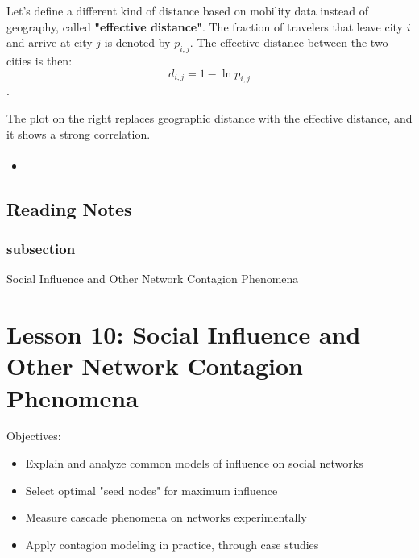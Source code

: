 \documentclass[11pt]{scrartcl} %
\begin{document}
Let's define a different kind of distance based on mobility data instead of geography, called \textbf{"effective distance"}. The fraction of travelers that leave city $i$ and arrive at city $j$ is denoted by $p_{i,j}$. The effective distance between the two cities is then: 
\[d_{i,j} = 1 - \ln p_{i,j} \].

The plot on the right replaces geographic distance with the effective distance, and it shows a strong correlation.



\paragraph{}

\textbf{}

\begin{itemize}
	\item 
\end{itemize}

\subsection{Reading Notes}

\subsubsection{subsection}
\textbf{}


 Social Influence and Other Network Contagion Phenomena
\section{Lesson 10: Social Influence and Other Network Contagion Phenomena}

Objectives:
\begin{itemize}
	\item Explain and analyze common models of influence on social networks 
	\item Select optimal "seed nodes" for maximum influence
	\item Measure cascade phenomena on networks experimentally
	\item Apply contagion modeling in practice, through case studies
\end{itemize}
\end{document}
